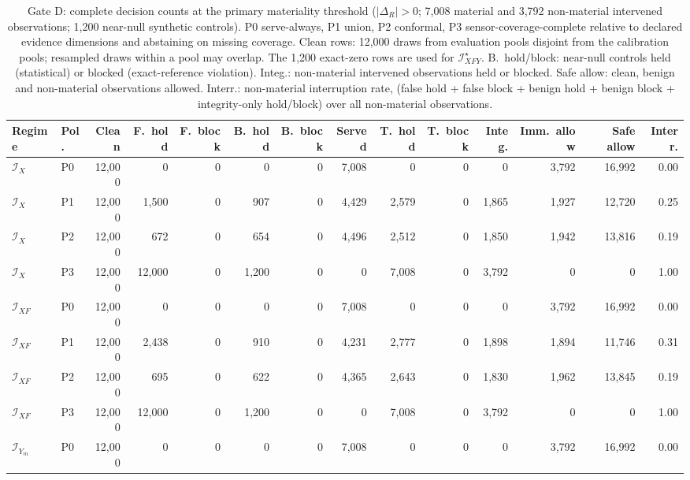 \begin{table}[!tbp]
\caption{Gate D: complete decision counts at the primary materiality threshold ($|\Delta_R|>0$; 7,008 material and 3,792 non-material intervened observations; 1,200 near-null synthetic controls). P0 serve-always, P1 union, P2 conformal, P3 sensor-coverage-complete relative to declared evidence dimensions and abstaining on missing coverage. Clean rows: 12,000 draws from evaluation pools disjoint from the calibration pools; resampled draws within a pool may overlap. The 1,200 exact-zero rows are used for $\mathcal I_{XFY}^{\star}$. B.\ hold/block: near-null controls held (statistical) or blocked (exact-reference violation). Integ.: non-material intervened observations held or blocked. Safe allow: clean, benign and non-material observations allowed. Interr.: non-material interruption rate, (false hold + false block + benign hold + benign block + integrity-only hold/block) over all non-material observations.}
\label{tab:s-policy-full}
\centering
\scriptsize
\setlength{\tabcolsep}{2pt}
\begin{tabular}{@{}llrrrrrrrrrrrr@{}}
\toprule
Regime & Pol. & Clean & F.\ hold & F.\ block & B.\ hold & B.\ block & Served & T.\ hold & T.\ block & Integ. & Imm.\ allow & Safe allow & Interr. \\
\midrule
$\mathcal I_X$ & P0 & 12,000 & 0 & 0 & 0 & 0 & 7,008 & 0 & 0 & 0 & 3,792 & 16,992 & 0.00 \\
$\mathcal I_X$ & P1 & 12,000 & 1,500 & 0 & 907 & 0 & 4,429 & 2,579 & 0 & 1,865 & 1,927 & 12,720 & 0.25 \\
$\mathcal I_X$ & P2 & 12,000 & 672 & 0 & 654 & 0 & 4,496 & 2,512 & 0 & 1,850 & 1,942 & 13,816 & 0.19 \\
$\mathcal I_X$ & P3 & 12,000 & 12,000 & 0 & 1,200 & 0 & 0 & 7,008 & 0 & 3,792 & 0 & 0 & 1.00 \\
\addlinespace[1pt]
$\mathcal I_{XF}$ & P0 & 12,000 & 0 & 0 & 0 & 0 & 7,008 & 0 & 0 & 0 & 3,792 & 16,992 & 0.00 \\
$\mathcal I_{XF}$ & P1 & 12,000 & 2,438 & 0 & 910 & 0 & 4,231 & 2,777 & 0 & 1,898 & 1,894 & 11,746 & 0.31 \\
$\mathcal I_{XF}$ & P2 & 12,000 & 695 & 0 & 622 & 0 & 4,365 & 2,643 & 0 & 1,830 & 1,962 & 13,845 & 0.19 \\
$\mathcal I_{XF}$ & P3 & 12,000 & 12,000 & 0 & 1,200 & 0 & 0 & 7,008 & 0 & 3,792 & 0 & 0 & 1.00 \\
\addlinespace[1pt]
$\mathcal I_{Y_m}$ & P0 & 12,000 & 0 & 0 & 0 & 0 & 7,008 & 0 & 0 & 0 & 3,792 & 16,992 & 0.00 \\

\end{tabular}
\end{table}
